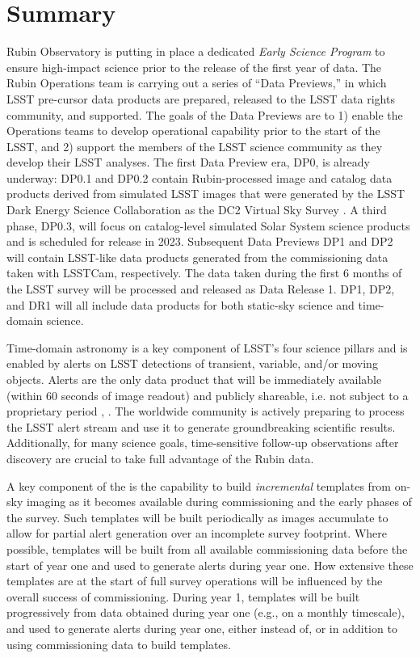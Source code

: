 \section{Summary}

Rubin Observatory is putting in place a dedicated {\it Early Science Program} to ensure high-impact science prior to the release of the first year of \lsst data.
The Rubin Operations team is carrying out a series of ``Data Previews,'' in which LSST pre-cursor data products are prepared, released to the LSST data rights community, and supported.
The goals of the Data Previews are to 1) enable the Operations teams to develop operational capability prior to the start of the LSST, and 2) support the members of the LSST science community as they develop their LSST analyses.
The first Data Preview era, DP0, is already underway: DP0.1 and DP0.2 contain Rubin-processed image and catalog data products derived from simulated LSST images that were generated by the LSST Dark Energy Science Collaboration as the DC2 Virtual Sky Survey \citep{2021ApJS..253...31L}.
A third phase, DP0.3, will focus on catalog-level simulated Solar System science products and is scheduled for release in 2023.
Subsequent Data Previews DP1 and DP2 will contain LSST-like data products generated from the commissioning data taken with LSSTCam, respectively.
The data taken during the first 6 months of the LSST survey will be processed and released as Data Release 1.
DP1, DP2, and DR1 will all include data products for both static-sky science and time-domain science.

Time-domain astronomy is a key component of LSST's four science pillars and is enabled by alerts on LSST detections of transient, variable, and/or moving objects.
Alerts are the only data product that will be immediately available (within 60 seconds of image readout) and publicly shareable, i.e. not subject to a proprietary period \citep{LSE-163},  \citep{RDO-013}.
The worldwide community is actively preparing to process the LSST alert stream and use it to generate groundbreaking scientific results. Additionally, for many science goals, time-sensitive follow-up observations after discovery are crucial to take full advantage of the Rubin data.

A key component of the \esp is the capability to build {\it incremental} templates from on-sky imaging as it becomes available during commissioning and the early phases of the survey.
Such templates will be built periodically as images accumulate to allow for partial alert generation over an incomplete survey footprint.
Where possible, templates will be built from all available commissioning data before the start of year one and used to generate alerts during year one.
How extensive these templates are at the start of full survey operations will be influenced by the overall success of commissioning.
During year 1, templates will be built progressively from data obtained during year one (e.g., on a monthly timescale), and used to generate alerts during year one, either instead of, or in addition to using commissioning data to build templates.
